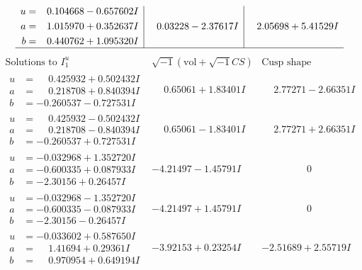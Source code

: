 \documentclass[1p]{elsarticle_modified}
\theoremstyle{definition}
\newcommand{\I}{\sqrt{-1}}
\begin{document}
$$\begin{array}{c|c|c}
\begin{aligned}
u &= \phantom{-}0.104668 - 0.657602 I \\
a &= \phantom{-}1.015970 + 0.352637 I \\
b &= \phantom{-}0.440762 + 1.095320 I\end{aligned}
 & \phantom{-}0.03228 - 2.37617 I & \phantom{-}2.05698 + 5.41529 I\\
 \hline 
 \end{array}$$\newpage$$\begin{array}{c|c|c}  
\text{Solutions to }I^u_{1}& \I (\text{vol} + \sqrt{-1}CS) & \text{Cusp shape}\\
 \hline 
\begin{aligned}
u &= \phantom{-}0.425932 + 0.502432 I \\
a &= \phantom{-}0.218708 + 0.840394 I \\
b &= -0.260537 - 0.727531 I\end{aligned}
 & \phantom{-}0.65061 + 1.83401 I & \phantom{-}2.77271 - 2.66351 I \\ \hline\begin{aligned}
u &= \phantom{-}0.425932 - 0.502432 I \\
a &= \phantom{-}0.218708 - 0.840394 I \\
b &= -0.260537 + 0.727531 I\end{aligned}
 & \phantom{-}0.65061 - 1.83401 I & \phantom{-}2.77271 + 2.66351 I \\ \hline\begin{aligned}
u &= -0.032968 + 1.352720 I \\
a &= -0.600335 + 0.087933 I \\
b &= -2.30156 + 0.26457 I\end{aligned}
 & -4.21497 - 1.45791 I & \phantom{-0.000000 } 0 \\ \hline\begin{aligned}
u &= -0.032968 - 1.352720 I \\
a &= -0.600335 - 0.087933 I \\
b &= -2.30156 - 0.26457 I\end{aligned}
 & -4.21497 + 1.45791 I & \phantom{-0.000000 } 0 \\ \hline\begin{aligned}
u &= -0.033602 + 0.587650 I \\
a &= \phantom{-}1.41694 + 0.29361 I \\
b &= \phantom{-}0.970954 + 0.649194 I\end{aligned}
 & -3.92153 + 0.23254 I & -2.51689 + 2.55719 I \\ \hline\begin{aligned}

\end{aligned}
\end{array}$$
\end{document}
